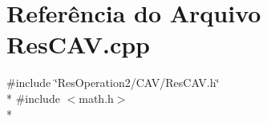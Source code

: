 \section{Referência do Arquivo Res\+C\+A\+V.\+cpp}
\label{_2_c_a_v_2_res_c_a_v_8cpp}
{\ttfamily \#include \char`\"{}Res\+Operation2/\+C\+A\+V/\+Res\+C\+A\+V.\+h\char`\"{}}\\*
{\ttfamily \#include $<$math.\+h$>$}\\*
